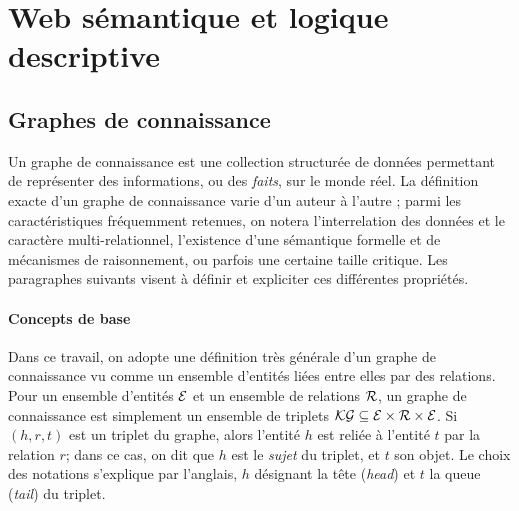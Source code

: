 \label{chap:revue}


\section{Web sémantique et logique descriptive}
\label{sec:dl}

\subsection{Graphes de connaissance}





Un graphe de connaissance est une collection structurée de données permettant de représenter des informations, ou des \textit{faits}, sur le monde réel. La définition exacte d'un graphe de connaissance varie d'un auteur à l'autre \cite{ehrlinger2016towards}; parmi les caractéristiques fréquemment retenues, on notera l'interrelation des données et le caractère multi-relationnel, l'existence d'une sémantique formelle et de mécanismes de raisonnement, ou parfois une certaine taille critique. Les paragraphes suivants visent à définir et expliciter ces différentes propriétés.


\paragraph{Concepts de base}

Dans ce travail, on adopte une définition très générale d'un graphe de connaissance vu comme un ensemble d'entités liées entre elles par des relations. Pour un ensemble d'entités $\mathcal{E}$ et un ensemble de relations $\mathcal{R}$, un graphe de connaissance est simplement un ensemble de triplets $\mathcal{KG} \subseteq \mathcal{E} \times \mathcal{R} \times \mathcal{E}$. Si $(h, r, t)$ est un triplet du graphe, alors l'entité $h$ est reliée à l'entité $t$ par la relation $r$; dans ce cas, on dit que $h$ est le \textit{sujet} du triplet, et $t$ son objet. Le choix des notations s'explique par l'anglais, $h$ désignant la tête (\textit{head}) et $t$ la queue (\textit{tail}) du triplet. 

